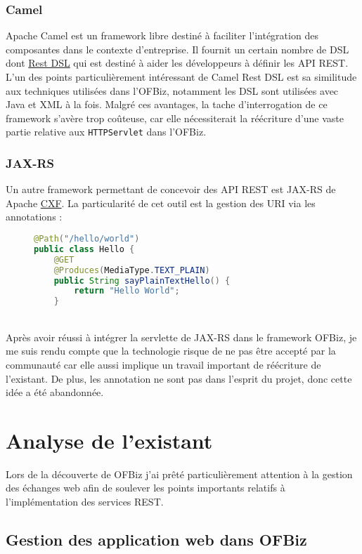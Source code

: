 \subsubsection{Camel}
Apache Camel est un framework libre destiné à faciliter l'intégration des composantes dans le contexte d'entreprise. Il fournit un certain nombre de DSL dont \href{https://camel.apache.org/rest-dsl.html}{Rest DSL} qui est destiné à aider les développeurs à définir les API REST. 
L'un des points particulièrement intéressant de Camel Rest DSL est sa similitude aux techniques utilisées dans l'OFBiz, notamment les DSL sont utilisées avec Java et XML à la fois. 
Malgré ces avantages, la tache d'interrogation de ce framework s'avère trop coûteuse, car elle nécessiterait la réécriture d'une vaste partie relative aux \verb|HTTPServlet| dans l'OFBiz. 
\subsubsection{JAX-RS}
Un autre framework permettant de concevoir des API REST est JAX-RS de Apache \href{http://cxf.apache.org/}{CXF}. La particularité de cet outil est la gestion des URI via les annotations : 
\begin{figure}[h!]
	\begin{lstlisting}[language=Java,frame=leftline]
@Path("/hello/world")
public class Hello {	
	@GET
	@Produces(MediaType.TEXT_PLAIN)
	public String sayPlainTextHello() {
		return "Hello World";
	}
	\end{lstlisting}
\end{figure}\\
Après avoir réussi à intégrer la servlette de JAX-RS dans le framework OFBiz, 
je me suis rendu compte que la technologie risque de ne pas être accepté par la communauté  car elle aussi implique un travail important de réécriture de l'existant. De plus, les annotation ne sont pas dans l'esprit du projet, donc cette idée a été abandonnée. 

\section{Analyse de l'existant}

Lors de la découverte de OFBiz j'ai prêté  particulièrement attention à la gestion des échanges web afin de soulever les points importants relatifs à l'implémentation des services REST. 


\subsection{Gestion des application web dans OFBiz}


